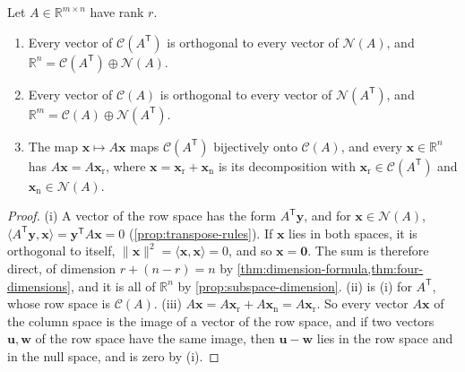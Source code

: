 \begin{proposition}
\label{prop:row-null-real}
Let $A\in\mathbb R^{m\times n}$ have rank $r$.
\begin{enumerate}
\item Every vector of $\mathcal C(A^{\mathsf T})$ is orthogonal to every vector of $\mathcal N(A)$, and $\mathbb R^n=\mathcal C(A^{\mathsf T})\oplus\mathcal N(A)$.
\item Every vector of $\mathcal C(A)$ is orthogonal to every vector of $\mathcal N(A^{\mathsf T})$, and $\mathbb R^m=\mathcal C(A)\oplus\mathcal N(A^{\mathsf T})$.
\item The map $\mathbf x\mapsto A\mathbf x$ maps $\mathcal C(A^{\mathsf T})$ bijectively onto $\mathcal C(A)$, and every $\mathbf x\in\mathbb R^n$ has $A\mathbf x=A\mathbf x_{\mathrm r}$, where $\mathbf x=\mathbf x_{\mathrm r}+\mathbf x_{\mathrm n}$ is its decomposition with $\mathbf x_{\mathrm r}\in\mathcal C(A^{\mathsf T})$ and $\mathbf x_{\mathrm n}\in\mathcal N(A)$.
\end{enumerate}
\end{proposition}

\begin{proof}
(i) A vector of the row space has the form $A^{\mathsf T}\mathbf y$, and for $\mathbf x\in\mathcal N(A)$, $\langle A^{\mathsf T}\mathbf y,\mathbf x\rangle=\mathbf y^{\mathsf T}A\mathbf x=0$ (\cref{prop:transpose-rules}). If $\mathbf x$ lies in both spaces, it is orthogonal to itself, $\|\mathbf x\|^2=\langle\mathbf x,\mathbf x\rangle=0$, and so $\mathbf x=\mathbf 0$. The sum is therefore direct, of dimension $r+(n-r)=n$ by \cref{thm:dimension-formula,thm:four-dimensions}, and it is all of $\mathbb R^n$ by \cref{prop:subspace-dimension}. (ii) is (i) for $A^{\mathsf T}$, whose row space is $\mathcal C(A)$. (iii) $A\mathbf x=A\mathbf x_{\mathrm r}+A\mathbf x_{\mathrm n}=A\mathbf x_{\mathrm r}$. So every vector $A\mathbf x$ of the column space is the image of a vector of the row space, and if two vectors $\mathbf u,\mathbf w$ of the row space have the same image, then $\mathbf u-\mathbf w$ lies in the row space and in the null space, and is zero by (i).
\end{proof}

